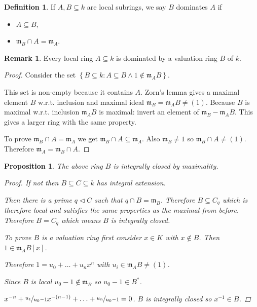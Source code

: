 \documentclass{article}
\newcommand{\setwith}[2]{\left\{#1:#2\right\}}
\newcommand{\maxid}{\mathfrak{m}}
\newcommand{\ideal}{\triangleleft}
\newtheorem{proposition}[theorem]{Proposition}
\theoremstyle{definition}
\newtheorem{definition}[theorem]{Definition}
\newtheorem{remark}[theorem]{Remark}
\begin{document}
\begin{definition}
    If \(A,B\subseteq k\) are local subrings, we say \(B\) dominates \(A\) if
    \begin{itemize}
        \item \(A\subseteq B\),
        \item \(\maxid_{B}\cap A=\maxid_{A}\).
    \end{itemize}
\end{definition}

\begin{remark}
    Every local ring \(A\subseteq k\) is dominated by a valuation ring \(B\) of
    \(k\).

    \begin{proof}
        Consider the set \(\setwith{B\subseteq k}{A\subseteq B\wedge 1\notin
            \maxid_{A}B}\).

        This set is non-empty because it contains \(A\). Zorn's lemma gives a
        maximal element \(B\) w.r.t. inclusion and maximal ideal
        \(\maxid_{B}=\maxid_{A}B\neq(1)\). Because \(B\) is maximal w.r.t.
        inclusion \(\maxid_{A}B\) is maximal: invert an element of
        \(\maxid_{B}-\maxid_{A}B\). This gives a larger ring with the same
        property.

        To prove \(\maxid_{B}\cap A=\maxid_{A}\) we get \(\maxid_{B}\cap
        A\subseteq\maxid_{A}\). Also \(\maxid_{B}\neq 1\) so \(\maxid_{B}\cap
        A\neq(1)\). Therefore \(\maxid_{A}=\maxid_{B}\cap A\).
    \end{proof}
\end{remark}

\begin{proposition}
    The above ring \(B\) is integrally closed by maximality.

    \begin{proof}
        If not then \(B\subseteq C\subseteq k\) has integral extension.

        Then there is a prime \(q\ideal C\) such that \(q\cap B=\maxid_{B}\).
        Therefore \(B\subseteq C_{q}\) which is therefore local and satisfies
        the same properties as the maximal from before. Therefore \(B=C_{q}\)
        which means \(B\) is integrally closed.

        To prove \(B\) is a valuation ring first consider \(x\in K\) with
        \(x\notin B\). Then \(1\in\maxid_{A}B[x]\).

        Therefore \(1=u_{0}+\ldots+u_{n}x^{n}\) with
        \(u_{i}\in\maxid_{A}B\neq(1)\).

        Since \(B\) is local \(u_{0}-1\notin\maxid_{B}\) so
        \(u_{0}-1\in B^{*}\).

        \(x^{-n}+\nicefrac{u_{1}}{u_{0}-1}x^{-(n-1)}+\ldots+\nicefrac{u_{n}}{u_{0}-1}=0\).
        \(B\) is integrally closed so \(x^{-1}\in B\).
    \end{proof}
\end{proposition}
\end{document}
